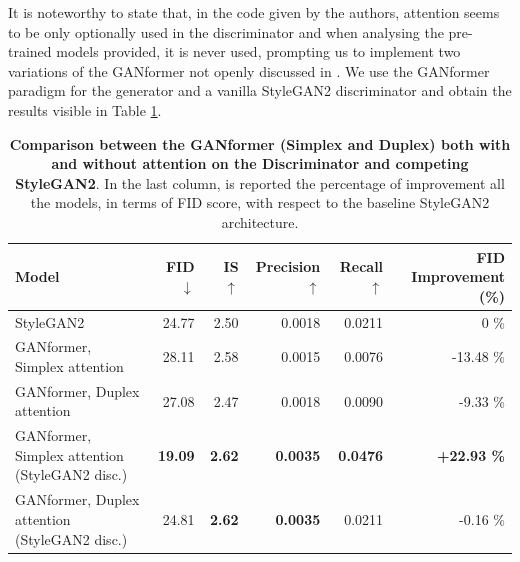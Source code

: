 \documentclass{article}
\begin{document}
It is noteworthy to state that, in the code given by the authors, attention seems to be only optionally 
used in the discriminator and when analysing the pre-trained models provided, it is never used,
prompting us to implement two variations of the GANformer not openly discussed in \cite{hudson2021generative}.
We use the GANformer paradigm for the generator and a vanilla StyleGAN2 discriminator and 
obtain the results visible in Table \ref{tab:our-results2}.
\begin{table}[htb]
	\centering
	\caption{\textbf{Comparison between the GANformer (Simplex and Duplex) both with and without 
	attention on the Discriminator and competing StyleGAN2}.  In the last column, is reported the 
	percentage of improvement all the models, in terms of FID score, with respect to the baseline 
	StyleGAN2 architecture.}
	\label{tab:our-results2}
	\vspace{3mm}
	\small
	\begin{tabular}{l|rrrrr}
		\toprule
		\textbf{Model}  & \textbf{FID $\downarrow$}  & \textbf{IS $\uparrow$} & 
		\textbf{Precision$\uparrow$}  & \textbf{Recall $\uparrow$} & \textbf{FID Improvement (\%)}\\ 
		\midrule
		StyleGAN2                    				&  24.77 & 2.50 & 0.0018 & 0.0211 & 0 \%\\ 
		GANformer, Simplex attention & 28.11 & 2.58 & 0.0015 & 0.0076 & -13.48 \%\\ 
		GANformer, Duplex attention  & 27.08 & 2.47 & 0.0018 & 0.0090 & -9.33  \%\\ 
		GANformer, Simplex attention (StyleGAN2 disc.) & \textbf{19.09} &  \textbf{2.62}  &  
		\textbf{0.0035}    & \textbf{0.0476}  & \textbf{+22.93 \%} \\ 
		GANformer, Duplex attention (StyleGAN2 disc.)  &  24.81  & \textbf{2.62} &   \textbf{0.0035}   
		& 0.0211 & 
		-0.16 \%\\ 
		\bottomrule
	\end{tabular}
\end{table}
\end{document}
